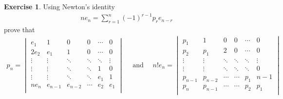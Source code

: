 \documentclass[8pt]{extarticle}
\newcommand{\<}{\langle}
\renewcommand{\>}{\rangle}
\theoremstyle{definition}
\newtheorem{exercise}{Exercise}
\begin{document}
\begin{exercise}
  Using Newton's identity
  \begin{align*}
    ne_n = \sum\limits_{r=1}^{n}(-1)^{r-1}p_r e_{n-r}
  \end{align*}
  prove that
  \begin{align*}
    p_n = 
    \begin{vmatrix}
      e_1 & 1 & 0 & 0 & \cdots & 0 \\
      2e_2 & e_1 & 1 & 0 & \cdots & 0 \\
      \vdots & \vdots & \ddots & \ddots  & \ddots & \vdots \\
      \vdots & \vdots & \ddots & \ddots  & 1 & 0 \\
      \vdots & \vdots & \ddots & \ddots  & e_1 & 1 \\            
      ne_n & e_{n-1} & e_{n-2} & \cdots  & e_2 & e_1 \\            
    \end{vmatrix}
    \quad \text { and } \quad
    n!e_n = 
    \begin{vmatrix}
      p_1 & 1 & 0 & 0 & \cdots & 0 \\
      p_2 & p_1 & 2 & 0 & \cdots & 0 \\
      \vdots & \vdots & \ddots & \ddots  & \ddots & \vdots \\
      \vdots & \vdots & \ddots & \ddots  & \ddots & 0 \\
      p_{n-1} & p_{n-2} & \cdots & \cdots  & p_1 & n-1 \\            
      p_n & p_{n-1} & \cdots & \cdots  & p_2 & p_1 \\            
    \end{vmatrix}    
  \end{align*}
\end{exercise}
\end{document}
